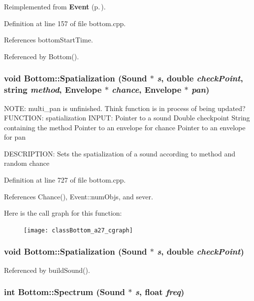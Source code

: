 Reimplemented from {\bf Event} {\rm (p.\,\pageref{classEvent_a7})}.

Definition at line 157 of file bottom.cpp.

References bottom\-Start\-Time.

Referenced by Bottom().
\subsubsection{\setlength{\rightskip}{0pt plus 5cm}void Bottom::Spatialization (Sound $\ast$ {\em s}, double {\em check\-Point}, string {\em method}, Envelope $\ast$ {\em chance}, Envelope $\ast$ {\em pan})}\label{classBottom_a27}


NOTE: multi\_\-pan is unfinished. Think function is in process of being updated? FUNCTION: spatialization INPUT: Pointer to a sound Double checkpoint String containing the method Pointer to an envelope for chance Pointer to an envelope for pan

DESCRIPTION: Sets the spatialization of a sound according to method and random chance 

Definition at line 727 of file bottom.cpp.

References Chance(), Event::num\-Objs, and sever.

Here is the call graph for this function:\begin{figure}[H]
\begin{center}
\leavevmode
\texttt{[image: classBottom\_a27\_cgraph]}
\end{center}
\end{figure}
\subsubsection{\setlength{\rightskip}{0pt plus 5cm}void Bottom::Spatialization (Sound $\ast$ {\em s}, double {\em check\-Point})}\label{classBottom_a26}




Referenced by build\-Sound().
\subsubsection{\setlength{\rightskip}{0pt plus 5cm}int Bottom::Spectrum (Sound $\ast$ {\em s}, float {\em freq})}\label{classBottom_a16}


